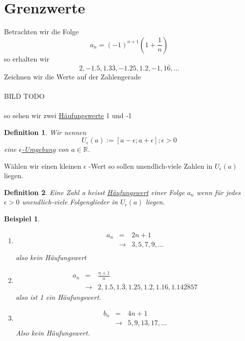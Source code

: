 \documentclass{report}
\newtheorem{mydef}{Definition}
\newtheorem{myexample}{Beispiel}
\newcommand{\R}{{\mathbb R}}
\begin{document}
\section{Grenzwerte}
Betrachten wir die Folge
\begin{equation*}a_n = (-1)^{n+1}(1+\frac{1}{n})\end{equation*}
so erhalten wir
\begin{equation*}
	2, -1.5,1.3\overline{3}, -1.25, 1.2,-1,1\overline{6}, \ldots
\end{equation*}
Zeichnen wir die Werte auf der Zahlengerade
\\\\ BILD TODO\\\\
so sehen wir zwei \underline{Häufungswerte} 1 und -1
\begin{mydef}Wir nennen
\begin{equation*}U_\epsilon(a) := [a-\epsilon; a + \epsilon]; \epsilon > 0\end{equation*}
eine \underline{$\epsilon$-Umgebung} von $a \in \R$.\end{mydef}
\noindent
Wählen wir einen kleinen $\epsilon$ -Wert so sollen unendlich-viele Zahlen in $U_\epsilon(a)$ liegen.
\begin{mydef}
	Eine Zahl a heisst \underline{Häufungswert} einer Folge $a_n$ wenn für jedes $\epsilon > 0$ unendlich-viele Folgenglieder in $U_{\epsilon}(a)$ liegen.
\end{mydef}
\begin{myexample}
\begin{enumerate}
	\item
	\begin{eqnarray}
	a_n &=& 2n + 1\\
	& \rightarrow& 3,5,7,9,\ldots\\
	\end{eqnarray}
	also kein Häufungswert
	\item 
	\begin{eqnarray}
	a_n & = & \frac{n+1}{n} \nonumber \\
	& \rightarrow & 2, 1.5, 1.\bar{3}, 1.25, 1.2, 1.16, 1.\bar{142857}\end{eqnarray}
	also ist 1 ein Häufungswert.
	\item \begin{eqnarray}b_n & = & 4n + 1 \nonumber \\
	& \rightarrow & 5, 9, 13, 17, ...\end{eqnarray}
	Also kein Häufungswert.
\end{enumerate}
\end{myexample}
\end{document}
